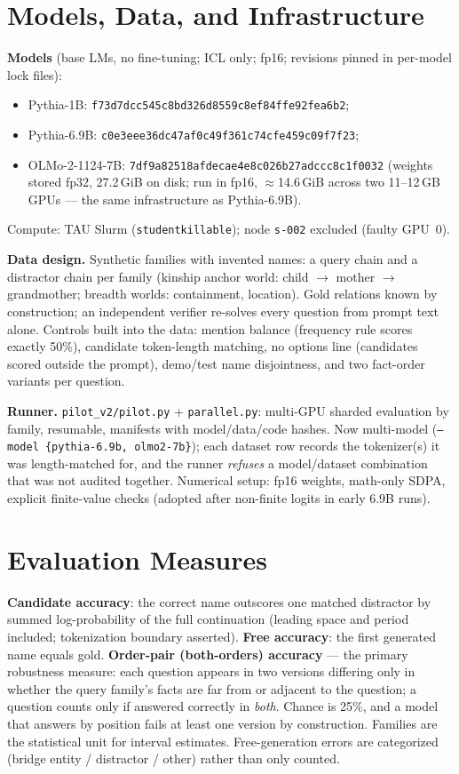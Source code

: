 \documentclass[11pt,a4paper]{article}
\newcommand{\file}[1]{\nolinkurl{#1}}
\begin{document}
\section{Models, Data, and Infrastructure}
\textbf{Models} (base LMs, no fine-tuning; ICL only; fp16; revisions pinned in per-model lock files):
\begin{itemize}
\item Pythia-1B: \file{f73d7dcc545c8bd326d8559c8ef84ffe92fea6b2};
\item Pythia-6.9B: \file{c0e3eee36dc47af0c49f361c74cfe459c09f7f23};
\item OLMo-2-1124-7B: \file{7df9a82518afdecae4e8c026b27adccc8c1f0032} (weights stored fp32, 27.2\,GiB on disk; run in fp16, $\approx$14.6\,GiB across two 11--12\,GB GPUs --- the same infrastructure as Pythia-6.9B).
\end{itemize}
Compute: TAU Slurm (\texttt{studentkillable}); node \texttt{s-002} excluded (faulty GPU~0).

\textbf{Data design.} Synthetic families with invented names: a query chain and a distractor chain per family (kinship anchor world: child $\to$ mother $\to$ grandmother; breadth worlds: containment, location). Gold relations known by construction; an independent verifier re-solves every question from prompt text alone. Controls built into the data: mention balance (frequency rule scores exactly 50\%), candidate token-length matching, no options line (candidates scored outside the prompt), demo/test name disjointness, and two fact-order variants per question.

\textbf{Runner.} \file{pilot_v2/pilot.py} + \file{parallel.py}: multi-GPU sharded evaluation by family, resumable, manifests with model/data/code hashes. Now multi-model (\texttt{--model \{pythia-6.9b, olmo2-7b\}}); each dataset row records the tokenizer(s) it was length-matched for, and the runner \emph{refuses} a model/dataset combination that was not audited together. Numerical setup: fp16 weights, math-only SDPA, explicit finite-value checks (adopted after non-finite logits in early 6.9B runs).

\section{Evaluation Measures}
\textbf{Candidate accuracy}: the correct name outscores one matched distractor by summed log-probability of the full continuation (leading space and period included; tokenization boundary asserted). \textbf{Free accuracy}: the first generated name equals gold. \textbf{Order-pair (both-orders) accuracy} --- the primary robustness measure: each question appears in two versions differing only in whether the query family's facts are far from or adjacent to the question; a question counts only if answered correctly in \emph{both}. Chance is 25\%, and a model that answers by position fails at least one version by construction. Families are the statistical unit for interval estimates. Free-generation errors are categorized (bridge entity / distractor / other) rather than only counted.
\end{document}
